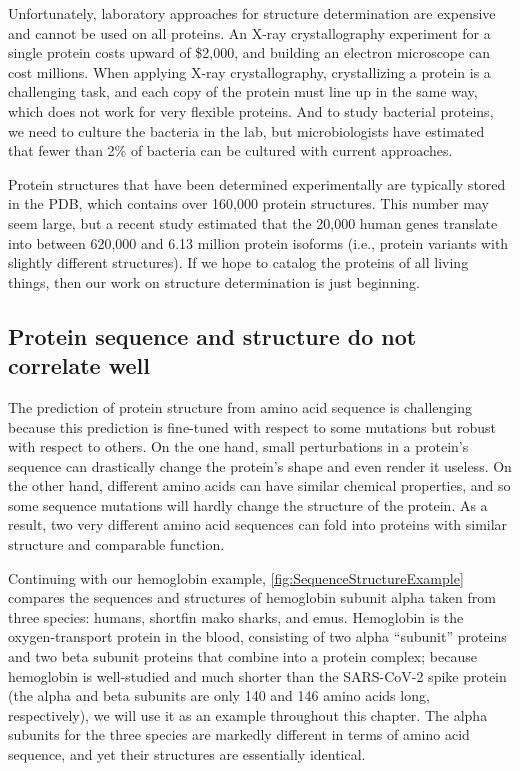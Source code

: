 Unfortunately, laboratory approaches for structure determination are expensive and cannot be used on all proteins. An X-ray crystallography experiment for a single protein costs upward of \$2,000, and building an electron microscope can cost millions. When applying X-ray crystallography, crystallizing a protein is a challenging task, and each copy of the protein must line up in the same way, which does not work for very flexible proteins.  And to study bacterial proteins, we need to culture the bacteria in the lab, but microbiologists have estimated that fewer than 2\% of bacteria can be cultured with current approaches.

Protein structures that have been determined experimentally are typically stored in the PDB, which contains over 160,000 protein structures. This number may seem large, but a recent study estimated that the 20,000 human genes translate into between 620,000 and 6.13 million protein isoforms (i.e., protein variants with slightly different structures). If we hope to catalog the proteins of all living things, then our work on structure determination is just beginning.

\FloatBarrier
{}
\subsection{Protein sequence and structure do not correlate well}

The prediction of protein structure from amino acid sequence is challenging because this prediction is fine-tuned with respect to some mutations but robust with respect to others. On the one hand, small perturbations in a protein's sequence can drastically change the protein's shape and even render it useless. On the other hand, different amino acids can have similar chemical properties, and so some sequence mutations will hardly change the structure of the protein. As a result, two very different amino acid sequences can fold into proteins with similar structure and comparable function.

Continuing with our hemoglobin example, \autoref{fig:SequenceStructureExample} compares the sequences and structures of hemoglobin subunit alpha taken from three species: humans, shortfin mako sharks, and emus. Hemoglobin is the oxygen-transport protein in the blood, consisting of two alpha ``subunit'' proteins and two beta subunit proteins that combine into a protein complex; because hemoglobin is well-studied and much shorter than the SARS-CoV-2 spike protein (the alpha and beta subunits are only 140 and 146 amino acids long, respectively), we will use it as an example throughout this chapter. The alpha subunits for the three species are markedly different in terms of amino acid sequence, and yet their structures are essentially identical.\\

